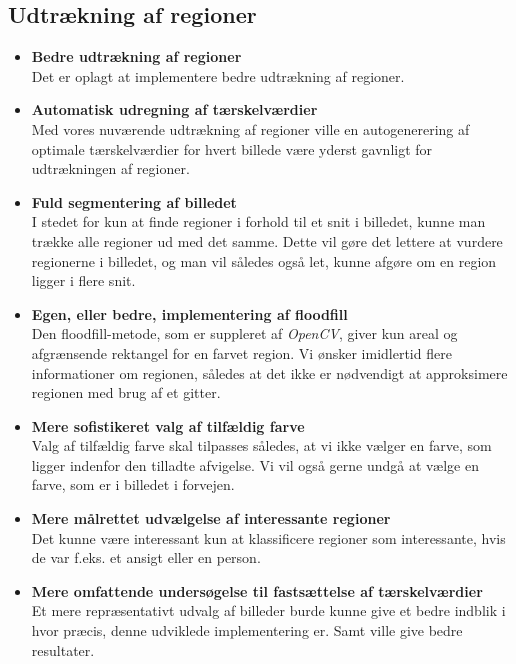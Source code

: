 {\subsection{Udtrækning af regioner}
\begin{itemize}
     \item \textbf{Bedre udtrækning af regioner}\\
        Det er oplagt at implementere bedre udtrækning af regioner.
     \item \textbf{Automatisk udregning af tærskelværdier}\\
        Med vores nuværende udtrækning af regioner ville en
        autogenerering af optimale tærskelværdier for hvert billede
        være yderst gavnligt for udtrækningen af regioner.
    \item \textbf{Fuld segmentering af billedet}\\
        I stedet for kun at finde regioner i forhold til et snit i
        billedet, kunne man trække alle regioner ud med det samme. Dette
        vil gøre det lettere at vurdere regionerne i billedet, og man
        vil således også let, kunne afgøre om en region ligger i flere snit.
  \item \textbf{Egen, eller bedre, implementering af floodfill}\\
        Den floodfill-metode, som er suppleret af \emph{OpenCV}, giver
        kun areal og afgrænsende rektangel for en farvet region. Vi
        ønsker imidlertid flere informationer om regionen, således at
        det ikke er nødvendigt at approksimere regionen med brug af et
        gitter.
    \item \textbf{Mere sofistikeret valg af tilfældig farve}\\
        Valg af tilfældig farve skal tilpasses således, at vi ikke
        vælger en farve, som ligger indenfor den tilladte afvigelse.
        Vi vil også gerne undgå at vælge en farve, som er i billedet i
        forvejen.
    \item \textbf{Mere målrettet udvælgelse af interessante regioner}\\
        Det kunne være interessant kun at klassificere regioner som
        interessante, hvis de var f.eks. et ansigt eller en person.
    \item \textbf{Mere omfattende undersøgelse til fastsættelse af tærskelværdier}\\
		Et mere repræsentativt udvalg af billeder burde kunne give et
		bedre indblik i hvor præcis, denne udviklede implementering er.
		Samt ville give bedre resultater.
\end{itemize}

}
